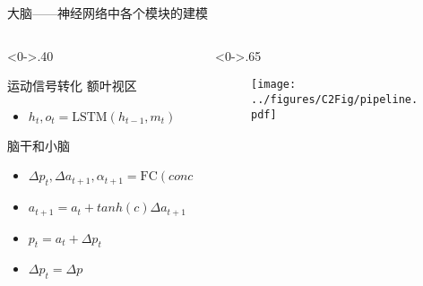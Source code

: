 \begin{frame}{大脑——神经网络中各个模块的建模}
	\begin{columns}[T] %
		\begin{column}<0->{.40\textwidth}
			
			\begin{block}{运动信号转化}
				额叶视区
				\begin{itemize}
					\item<0-> $ h_t, o_t = \text{LSTM}(h_{t-1}, m_t) $
				\end{itemize}
				
				脑干和小脑
				\begin{itemize}
					\item<0-> $ \Delta p_t, \Delta a_{t+1}, \alpha_{t+1} = \text{FC}(conc(d_t), o_t) $
					\item<0-> $ a_{t+1} = a_t + tanh(c) \Delta a_{t+1} $
					\item<0-> $ p_t = a_t + \Delta p_t $
					\item<0-> $ \Delta p_t = \Delta p $
				\end{itemize}
			\end{block}
			
		\end{column}
		\hfill%
		
		\begin{column}<0->{.65\textwidth}
			\begin{figure}[!t]
				\centering
				\texttt{[image: ../figures/C2Fig/pipeline.pdf]}
			\end{figure}
		\end{column}%
	\end{columns}
	
\end{frame}


